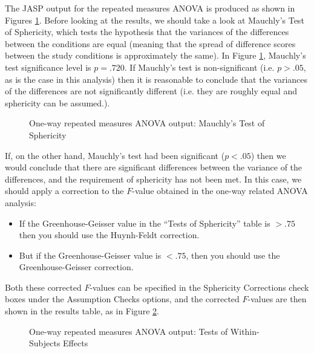The JASP output for the repeated measures ANOVA is produced as shown in Figures \ref{fig:RManova2}. Before looking at the results, we should take a look at Mauchly’s Test of Sphericity, which tests the hypothesis that the variances of the differences between the conditions are equal (meaning that the spread of difference scores between the study conditions is approximately the same). In Figure \ref{fig:RManova2}, Mauchly’s test significance level is $p=.720$. If Mauchly’s test is non-significant (i.e. $p>.05$, as is the case in this analysis) then it is reasonable to conclude that the variances of the differences are not significantly different (i.e. they are roughly equal and sphericity can be assumed.). 

\begin{figure}[!ht]
\begin{center}
\caption{One-way repeated measures ANOVA output: Mauchly’s Test of Sphericity}
\HR
\label{fig:RManova2}
\end{center}
\end{figure}

If, on the other hand, Mauchly’s test had been significant ($p<.05$) then we would conclude that there are significant differences between the variance of the differences, and the requirement of sphericity has not been met. In this case, we should apply a correction to the $F$-value obtained in the one-way related ANOVA analysis: 

\begin{itemize} \itemsep -2pt
\item If the Greenhouse-Geisser value in the “Tests of Sphericity” table is $>.75$ then you should use the Huynh-Feldt correction. 
\item But if the Greenhouse-Geisser value is $<.75$, then you should use the Greenhouse-Geisser correction. 
\end{itemize}

Both these corrected $F$-values can be specified in the Sphericity Corrections check boxes under the Assumption Checks options, and the corrected $F$-values are then shown in the results table, as in Figure \ref{fig:RManova3}.

\begin{figure}[!ht]
\begin{center}
\caption{One-way repeated measures ANOVA output: Tests of Within-Subjects Effects}
\HR
\label{fig:RManova3}
\end{center}
\end{figure}

